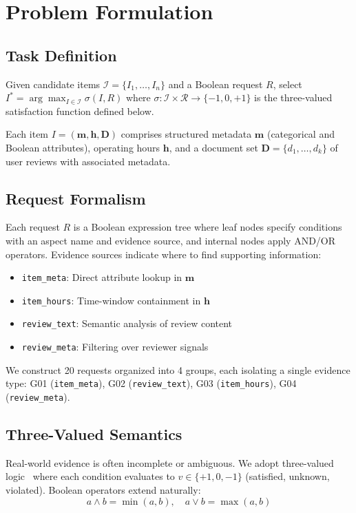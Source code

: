 \section{Problem Formulation}

\subsection{Task Definition}

Given candidate items $\mathcal{I} = \{I_1, \ldots, I_n\}$ and a Boolean request $R$, select $I^* = \arg\max_{I \in \mathcal{I}} \sigma(I, R)$ where $\sigma: \mathcal{I} \times \mathcal{R} \to \{-1, 0, +1\}$ is the three-valued satisfaction function defined below.

Each item $I = (\mathbf{m}, \mathbf{h}, \mathbf{D})$ comprises structured metadata $\mathbf{m}$ (categorical and Boolean attributes), operating hours $\mathbf{h}$, and a document set $\mathbf{D} = \{d_1, \ldots, d_k\}$ of user reviews with associated metadata.

\subsection{Request Formalism}

Each request $R$ is a Boolean expression tree where leaf nodes specify conditions with an aspect name and evidence source, and internal nodes apply AND/OR operators.
Evidence sources indicate where to find supporting information:
\begin{itemize}[nosep]
    \item \texttt{item\_meta}: Direct attribute lookup in $\mathbf{m}$
    \item \texttt{item\_hours}: Time-window containment in $\mathbf{h}$
    \item \texttt{review\_text}: Semantic analysis of review content
    \item \texttt{review\_meta}: Filtering over reviewer signals
\end{itemize}
We construct 20 requests organized into 4 groups, each isolating a single evidence type: G01 (\texttt{item\_meta}), G02 (\texttt{review\_text}), G03 (\texttt{item\_hours}), G04 (\texttt{review\_meta}).

\subsection{Three-Valued Semantics}
\label{sec:problem}

Real-world evidence is often incomplete or ambiguous.
We adopt three-valued logic~\cite{fitting1985kripke} where each condition evaluates to $v \in \{+1, 0, -1\}$ (satisfied, unknown, violated).
Boolean operators extend naturally:
\begin{equation}
    a \land b = \min(a, b), \quad a \lor b = \max(a, b)
\end{equation}

